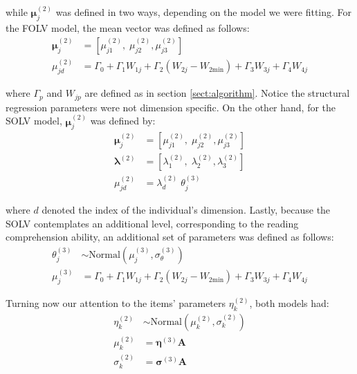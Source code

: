 \noindent while $\boldsymbol{\mu}^{(2)}_{j}$ was defined in two ways, depending on the model we were fitting. For the FOLV model, the mean vector was defined as follows:
%
\begin{align}
	\boldsymbol{\mu}^{(2)}_{j} &= \left[ \mu^{(2)}_{j1}, \; \mu^{(2)}_{j2}, \mu^{(2)}_{j3} \right] \label{eq:mu_FOLV} \\
	\mu^{(2)}_{jd} &= \Gamma_{0} + \Gamma_{1} W_{1j} + \Gamma_{2} (W_{2j} - W_{2\text{min}}) + \Gamma_{3} W_{3j} + \Gamma_{4} W_{4j}
\end{align}

\noindent where $\Gamma_{p}$ and $W_{jp}$ are defined as in section \ref{sect:algorithm}. Notice the structural regression parameters were not dimension specific. On the other hand, for the SOLV model, $\boldsymbol{\mu}^{(2)}_{j}$ was defined by:
%
\begin{align}
	\boldsymbol{\mu}^{(2)}_{j} &= \left[ \mu^{(2)}_{j1}, \; \mu^{(2)}_{j2}, \mu^{(2)}_{j3} \right] \\
	\pmb{\lambda}^{(2)} &= \left[ \lambda^{(2)}_{1}, \; \lambda^{(2)}_{2}, \lambda^{(2)}_{3} \right] \\
	\mu^{(2)}_{jd} &= \lambda^{(2)}_{d} \; \theta^{(3)}_{j} 
\end{align}

\noindent where $d$ denoted the index of the individual's dimension. Lastly, because the SOLV contemplates an additional level, corresponding to the reading comprehension ability, an additional set of parameters was defined as follows:
%
\begin{align}
	\theta^{(3)}_{j} &\sim \text{Normal} \left( \mu^{(3)}_{j}, \sigma^{(3)}_{\theta} \right) \label{eq:theta} \\
	\mu^{(3)}_{j} &=  \Gamma_{0} + \Gamma_{1} W_{1j} + \Gamma_{2} (W_{2j} - W_{2\text{min}}) + \Gamma_{3} W_{3j} + \Gamma_{4} W_{4j} \label{eq:mu_SOLV}
\end{align}

Turning now our attention to the items' parameters $\eta^{(2)}_{k}$, both models had:
%
\begin{align}
	\eta^{(2)}_{k} &\sim \text{Normal} \left( \mu^{(2)}_{k}, \sigma^{(2)}_{k} \right) \label{eq:items} \\
	\mu^{(2)}_{k} &= \pmb{\eta}^{(3)} \mathbf{A} \label{eq:mu_items} \\
	\sigma^{(2)}_{k} &= \pmb{\sigma}^{(3)} \mathbf{A} \label{eq:sigma_items}
\end{align}


